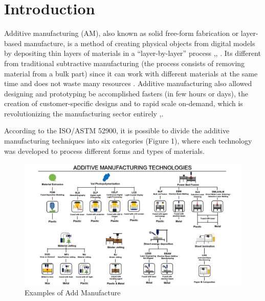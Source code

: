 \section{Introduction}

Additive manufacturing (AM), also known as solid free-form fabrication or layer-based manufacture, is a method of creating physical objects from digital models by depositing thin layers of materials in a “layer-by-layer” process \cite{Wang2020},\cite{Saxon2020}, \cite{Sun2019}. Its different from traditional subtractive manufacturing (the process consists of removing material from a bulk part) since it can work with different materials at the same time and does not waste many resources \cite{Ferreira2019}. Additive manufacturing also allowed designing and prototyping be accomplished fasters (in few hours or days), the creation of customer-specific designs and to rapid scale on-demand, which is revolutionizing the manufacturing sector entirely \cite{Rosa2018},\cite{Boni2020}.

According to the ISO/ASTM 52900, it is possible to divide the additive manufacturing techniques into six categories (Figure 1), where each technology was developed to process different forms and types of materials.

\begin{figure}[h]
	\centering
	\includegraphics[width=0.7\linewidth]{"figs/Add Manuf Tech"}
	\caption{Examples of Add Manufacture}
	\label{fig:add-manuf-tech}
\end{figure}
